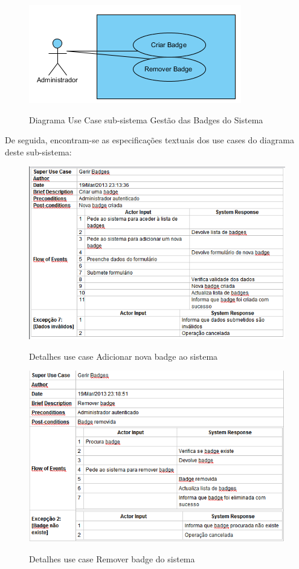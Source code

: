 ﻿\documentclass[12pt,a4paper]{article}
\begin{document}
\begin{figure}[h!]
\centering
\includegraphics[scale=1]{usecase/A_GerirBadges}
\label{usecase}
\caption{Diagrama Use Case sub-sistema Gestão das Badges do Sistema}
\end{figure}

De seguida, encontram-se as especificações textuais dos use cases do diagrama deste sub-sistema:\\

\begin{figure}[h!]
\centering
\includegraphics[scale=0.7]{d_usecase/A_criarbadge}
\label{usecase}
\caption{Detalhes use case Adicionar nova badge ao sistema}
\end{figure}

\begin{figure}[h!]
\centering
\includegraphics[scale=0.7]{d_usecase/A_removerbadge}
\label{usecase}
\caption{Detalhes use case Remover badge do sistema}
\end{figure}
\end{document}
